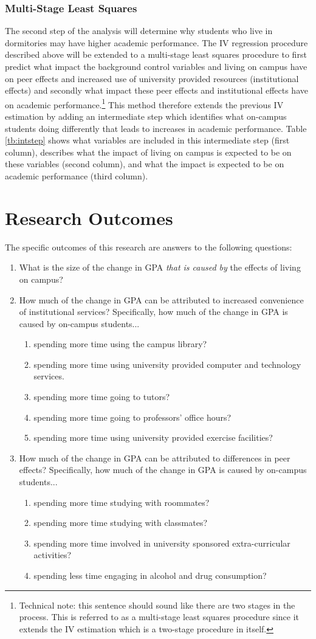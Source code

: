 \documentclass[11pt]{article}
\newcommand{\be}{
  \begin{enumerate}
  \setlength{\itemsep}{0pt}
  \setlength{\parskip}{0pt}
}
\newcommand{\ee}{\end{enumerate}}
\begin{document}
\subsubsection{Multi-Stage Least Squares}
The second step of the analysis will determine why students who live in dormitories may have higher academic performance.  The IV regression procedure described above will be extended to a multi-stage least squares procedure to first predict what impact the background control variables and living on campus have on peer effects and increased use of university provided resources (institutional effects) and secondly what impact these peer effects and institutional effects have on academic performance.\footnote{Technical note: this sentence should sound like there are two stages in the process.  This is referred to as a multi-stage least squares procedure since it extends the IV estimation which is a two-stage procedure in itself.}  This method therefore extends the previous IV estimation by adding an intermediate step which identifies what on-campus students doing differently that leads to increases in academic performance.  Table \ref{tb:intstep} shows what variables are included in this intermediate step (first column), describes what the impact of living on campus is expected to be on these variables (second column), and what the impact is expected to be on academic performance (third column).

\section{Research Outcomes}
The specific outcomes of this research are answers to the following questions:\be
\item What is the size of the change in GPA \textit{that is caused by} the effects of living on campus?
\item How much of the change in GPA can be attributed to increased convenience of institutional services?  Specifically, how much of the change in GPA is caused by on-campus students...
  \be
  \item spending more time using the campus library?
  \item spending more time using university provided computer and technology services.
  \item spending more time going to tutors?
  \item spending more time going to professors' office hours?
  \item spending more time using university provided exercise facilities?
  \ee
\item How much of the change in GPA can be attributed to differences in peer effects?  Specifically, how much of the change in GPA is caused by on-campus students...
  \be
  \item spending more time studying with roommates?
  \item spending more time studying with classmates?
  \item spending more time involved in university sponsored extra-curricular activities?
  \item spending less time engaging in alcohol and drug consumption?
  \ee
\ee
\end{document}

